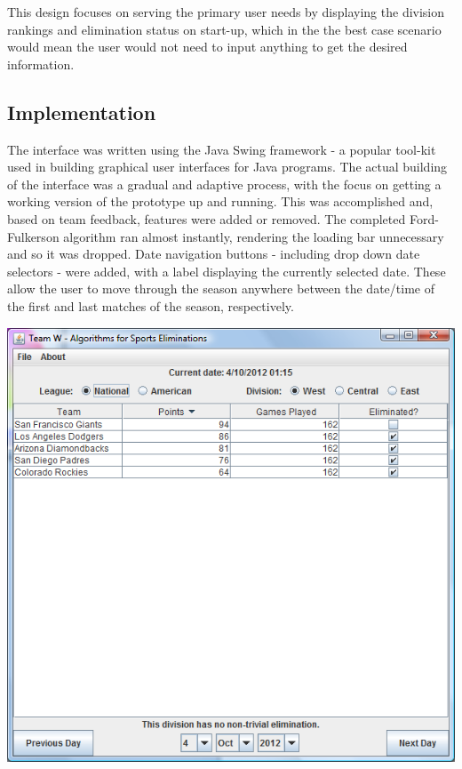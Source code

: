 This design focuses on serving the primary user needs by displaying the division
rankings and elimination status on start-up, which in the the best case scenario
would mean the user would not need to input anything to get the desired
information.

\subsection{Implementation}

The interface was written using the Java Swing framework - a popular tool-kit
used in building graphical user interfaces for Java programs. The actual
building of the interface was a gradual and adaptive process, with the focus on
getting a working version of the  prototype up and running. This was
accomplished and, based on team feedback, features were added or removed. The
completed Ford-Fulkerson algorithm ran almost instantly, rendering the loading
bar unnecessary and so it was dropped. Date navigation buttons - including drop
down date selectors - were added, with a label displaying the currently selected
date. These  allow the user to move through the season anywhere between the
date/time of  the first and last matches of the season, respectively.

\includegraphics[width=0.9\linewidth,keepaspectratio]
{images/finalDesktopUI.png}


